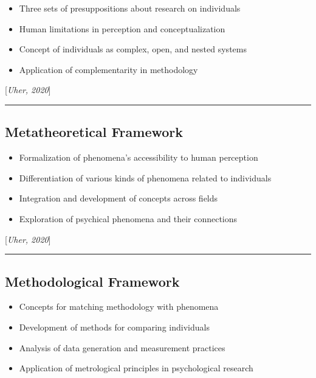 \documentclass[
  letterpaper,
  DIV=11,
  numbers=noendperiod]{scrartcl}
\providecommand{\tightlist}{%
  \setlength{\itemsep}{0pt}\setlength{\parskip}{0pt}}\usepackage{longtable,booktabs,array}
\begin{document}
\begin{itemize}
\tightlist
\item
  Three sets of presuppositions about research on individuals
\item
  Human limitations in perception and conceptualization
\item
  Concept of individuals as complex, open, and nested systems
\item
  Application of complementarity in methodology
\end{itemize}

{[}\emph{Uher, 2020}{]}

\begin{center}\rule{0.5\linewidth}{0.5pt}\end{center}

\subsection{Metatheoretical Framework}\label{metatheoretical-framework}

\begin{itemize}
\tightlist
\item
  Formalization of phenomena's accessibility to human perception
\item
  Differentiation of various kinds of phenomena related to individuals
\item
  Integration and development of concepts across fields
\item
  Exploration of psychical phenomena and their connections
\end{itemize}

{[}\emph{Uher, 2020}{]}

\begin{center}\rule{0.5\linewidth}{0.5pt}\end{center}

\subsection{Methodological Framework}\label{methodological-framework}

\begin{itemize}
\tightlist
\item
  Concepts for matching methodology with phenomena
\item
  Development of methods for comparing individuals
\item
  Analysis of data generation and measurement practices
\item
  Application of metrological principles in psychological research
\end{itemize}
\end{document}
